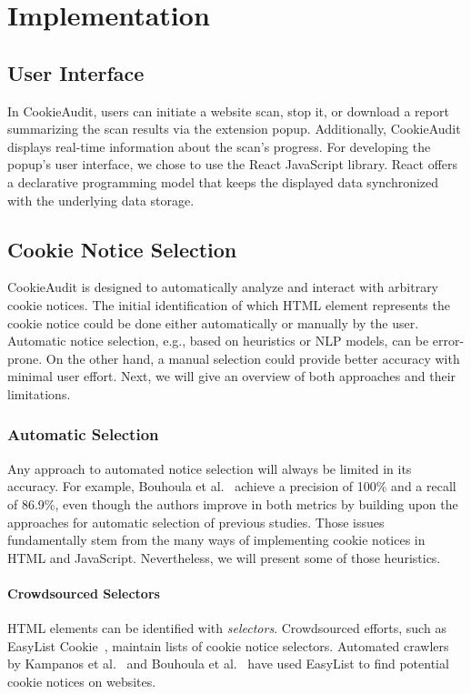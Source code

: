 \chapter{Implementation} \label{ch:implementation}

\section{User Interface}
In CookieAudit, users can initiate a website scan, stop it, or download a report summarizing the scan results via the extension popup.
Additionally, CookieAudit displays real-time information about the scan's progress.
For developing the popup's user interface, we chose to use the React JavaScript library.
React offers a declarative programming model that keeps the displayed data synchronized with the underlying data storage.

\section{Cookie Notice Selection}
CookieAudit is designed to automatically analyze and interact with arbitrary cookie notices. 
The initial identification of which HTML element represents the cookie notice could be done either automatically or manually by the user.
Automatic notice selection, e.g., based on heuristics or NLP models, can be error-prone.
On the other hand, a manual selection could provide better accuracy with minimal user effort.
Next, we will give an overview of both approaches and their limitations.

\subsection{Automatic Selection}
Any approach to automated notice selection will always be limited in its accuracy.
For example, Bouhoula et al.~\cite{bouhoula2023automated} achieve a precision of 100\% and a recall of 86.9\%, even though the authors improve in both metrics by building upon the approaches for automatic selection of previous studies.
Those issues fundamentally stem from the many ways of implementing cookie notices in HTML and JavaScript.
Nevertheless, we will present some of those heuristics.

\subsubsection{Crowdsourced Selectors}
HTML elements can be identified with \emph{selectors}. 
Crowdsourced efforts, such as EasyList Cookie~\cite{easylist2024cookie}, maintain lists of cookie notice selectors.
Automated crawlers by Kampanos et al.~\cite{kampanos2021accept} and Bouhoula et al.~\cite{bouhoula2023automated} have used EasyList to find potential cookie notices on websites.

